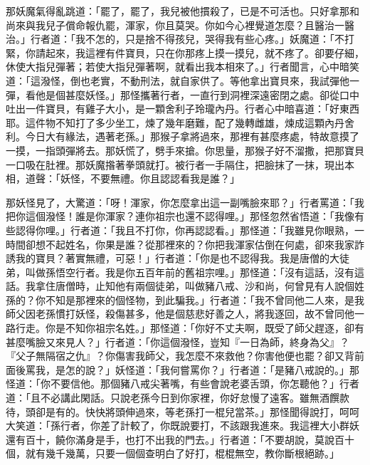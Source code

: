 那妖魔氣得亂跳道：「罷了，罷了，我兒被他摜殺了，已是不可活也。只好拿那和尚來與我兒子償命報仇罷，渾家，你且莫哭。你如今心裡覺道怎麼？且醫治一醫治。」行者道：「我不怎的，只是捨不得孩兒，哭得我有些心疼。」妖魔道：「不打緊，你請起來，我這裡有件寶貝，只在你那疼上摸一摸兒，就不疼了。卻要仔細，休使大指兒彈著；若使大指兒彈著啊，就看出我本相來了。」行者聞言，心中暗笑道：「這潑怪，倒也老實，不動刑法，就自家供了。等他拿出寶貝來，我試彈他一彈，看他是個甚麼妖怪。」那怪攜著行者，一直行到洞裡深遠密閉之處。卻從口中吐出一件寶貝，有雞子大小，是一顆舍利子玲瓏內丹。行者心中暗喜道：「好東西耶。這件物不知打了多少坐工，煉了幾年磨難，配了幾轉雌雄，煉成這顆內丹舍利。今日大有緣法，遇著老孫。」那猴子拿將過來，那裡有甚麼疼處，特故意摸了一摸，一指頭彈將去。那妖慌了，劈手來搶。你思量，那猴子好不溜撒，把那寶貝一口吸在肚裡。那妖魔揝著拳頭就打。被行者一手隔住，把臉抹了一抹，現出本相，道聲：「妖怪，不要無禮。你且認認看我是誰？」

那妖怪見了，大驚道：「呀！渾家，你怎麼拿出這一副嘴臉來耶？」行者罵道：「我把你這個潑怪！誰是你渾家？連你祖宗也還不認得哩。」那怪忽然省悟道：「我像有些認得你哩。」行者道：「我且不打你，你再認認看。」那怪道：「我雖見你眼熟，一時間卻想不起姓名，你果是誰？從那裡來的？你把我渾家估倒在何處，卻來我家詐誘我的寶貝？著實無禮，可惡！」行者道：「你是也不認得我。我是唐僧的大徒弟，叫做孫悟空行者。我是你五百年前的舊祖宗哩。」那怪道：「沒有這話，沒有這話。我拿住唐僧時，止知他有兩個徒弟，叫做豬八戒、沙和尚，何曾見有人說個姓孫的？你不知是那裡來的個怪物，到此騙我。」行者道：「我不曾同他二人來，是我師父因老孫慣打妖怪，殺傷甚多，他是個慈悲好善之人，將我逐回，故不曾同他一路行走。你是不知你祖宗名姓。」那怪道：「你好不丈夫啊，既受了師父趕逐，卻有甚麼嘴臉又來見人？」行者道：「你這個潑怪，豈知『一日為師，終身為父』？『父子無隔宿之仇』？你傷害我師父，我怎麼不來救他？你害他便也罷？卻又背前面後罵我，是怎的說？」妖怪道：「我何嘗罵你？」行者道：「是豬八戒說的。」那怪道：「你不要信他。那個豬八戒尖著嘴，有些會說老婆舌頭，你怎聽他？」行者道：「且不必講此閑話。只說老孫今日到你家裡，你好怠慢了遠客。雖無酒饌款待，頭卻是有的。快快將頭伸過來，等老孫打一棍兒當茶。」那怪聞得說打，呵呵大笑道：「孫行者，你差了計較了，你既說要打，不該跟我進來。我這裡大小群妖還有百十，饒你滿身是手，也打不出我的門去。」行者道：「不要胡說，莫說百十個，就有幾千幾萬，只要一個個查明白了好打，棍棍無空，教你斷根絕跡。」

